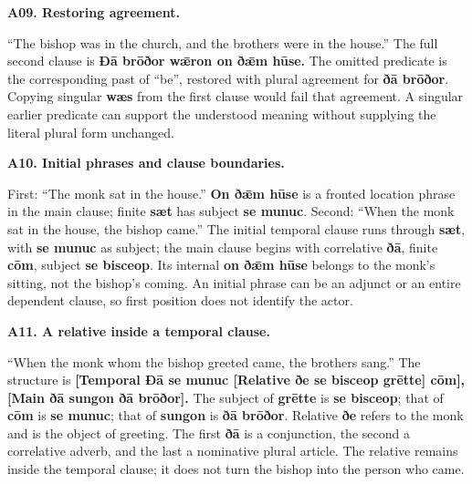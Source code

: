 \par\begin{minipage}{\linewidth}\raggedright
\textbf{A09. Restoring agreement.}

“The bishop was in the church, and the brothers were in the house.” The full second clause is \textbf{Ðā brōðor wǣron on ðǣm hūse.} The omitted predicate is the corresponding past of “be”, restored with plural agreement for \textbf{ðā brōðor}. Copying singular \textbf{wæs} from the first clause would fail that agreement. A singular earlier predicate can support the understood meaning without supplying the literal plural form unchanged.

\end{minipage}\par\addvspace{4pt}

\par\begin{minipage}{\linewidth}\raggedright
\textbf{A10. Initial phrases and clause boundaries.}

First: “The monk sat in the house.” \textbf{On ðǣm hūse} is a fronted location phrase in the main clause; finite \textbf{sæt} has subject \textbf{se munuc}. Second: “When the monk sat in the house, the bishop came.” The initial temporal clause runs through \textbf{sæt}, with \textbf{se munuc} as subject; the main clause begins with correlative \textbf{ðā}, finite \textbf{cōm}, subject \textbf{se bisceop}. Its internal \textbf{on ðǣm hūse} belongs to the monk’s sitting, not the bishop’s coming. An initial phrase can be an adjunct or an entire dependent clause, so first position does not identify the actor.

\end{minipage}\par\addvspace{4pt}

\par\begin{minipage}{\linewidth}\raggedright
\textbf{A11. A relative inside a temporal clause.}

“When the monk whom the bishop greeted came, the brothers sang.” The structure is \textbf{[Temporal Ðā se munuc [Relative ðe se bisceop grētte] cōm], [Main ðā sungon ðā brōðor].} The subject of \textbf{grētte} is \textbf{se bisceop}; that of \textbf{cōm} is \textbf{se munuc}; that of \textbf{sungon} is \textbf{ðā brōðor}. Relative \textbf{ðe} refers to the monk and is the object of greeting. The first \textbf{ðā} is a conjunction, the second a correlative adverb, and the last a nominative plural article. The relative remains inside the temporal clause; it does not turn the bishop into the person who came.

\end{minipage}\par\addvspace{4pt}

